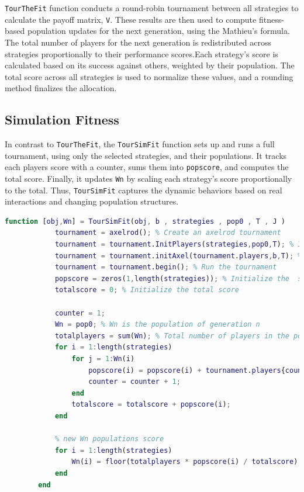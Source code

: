 \documentclass[12pt]{article}
\begin{document}
\texttt{TourTheFit} function conducts a round-robin tournament between all strategies to calculate the payoff matrix, \texttt{V}. These results are then used to compute fitness-based population updates for the next generation, using the Mathieu's formula.
The total number of players for the next generation is redistributed across strategies proportionally to their performance scores.Each strategy's score is calculated based on its success against others, weighted by their population. The total score across all strategies is used to normalize these values, and a rounding method finalizes the allocation.


\subsection{Simulation Fitness}
In contrast to \texttt{TourTheFit}, the \texttt{TourSimFit} function sets up and runs a full tournament, using only the selected strategies, and their populations. It tracks each players score with a counter, sums them into \texttt{popscore}, and computes the total score. Finally, it updates \texttt{Wn} by scaling each strategy's score proportionally to the total. Thus, \texttt{TourSimFit} captures the dynamic behaviors based on real interactions and changing population structures.

\begin{lstlisting}[language=Matlab, caption = TourSimFit function]
function [obj,Wn] = TourSimFit(obj, b , strategies , pop0 , T , J )
            tournament = axelrod(); % Create an axelrod tournament  
            tournament = tournament.InitPlayers(strategies,pop0,T); % Initialize players
            tournament = tournament.initAxel(tournament.players,b,T); % Initialize the tournament with players and payoff matrix
            tournament = tournament.begin(); % Run the tournament
            popscore = zeros(1,length(strategies)); % Initialize the  score of each population 
            totalscore = 0; % Initialize the total score
        
            counter = 1;
            Wn = pop0; % Wn is the population of generation n
            totalplayers = sum(Wn); % Total number of players in the population
            for i = 1:length(strategies)
                for j = 1:Wn(i)
                    popscore(i) = popscore(i) + tournament.players{counter}.getScore();
                    counter = counter + 1;
                end
                totalscore = totalscore + popscore(i);
            end
            
            % new Wn populations score
            for i = 1:length(strategies)
                Wn(i) = floor(totalplayers * popscore(i) / totalscore) ;
            end
        end
\end{lstlisting}
\newpage
\end{document}
